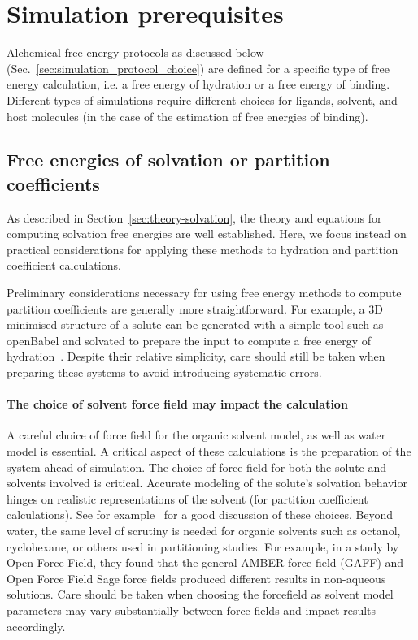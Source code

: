 \documentclass[9pt,bestpractices]{livecoms}
\begin{document}
\section{Simulation prerequisites}
\label{sec:prerequisites}
Alchemical free energy protocols as discussed below (Sec.~\ref{sec:simulation_protocol_choice}) are defined for a specific type of free energy calculation, i.e. a free energy of hydration or a free energy of binding. Different types of simulations require different choices for ligands, solvent, and host molecules (in the case of the estimation of free energies of binding). 

\subsection{Free energies of solvation or partition coefficients}
As described in Section~\ref{sec:theory-solvation}, the theory and equations for computing solvation free energies are well established. Here, we focus instead on practical considerations for applying these methods to hydration and partition coefficient calculations.

\label{subsec:hydration}
Preliminary considerations necessary for using free energy methods to compute partition coefficients are generally more straightforward. For example, a 3D minimised structure of a solute can be generated with a simple tool such as openBabel and solvated to prepare the input to compute a free energy of hydration~\cite{oboyle2011open}. Despite their relative simplicity, care should still be taken when preparing these systems to avoid introducing systematic errors.

\paragraph{The choice of solvent force field may impact the calculation}
A careful choice of force field for the organic solvent model, as well as water model is essential. A critical aspect of these calculations is the preparation of the system ahead of simulation. The choice of force field for both the solute and solvents involved is critical. Accurate modeling of the solute's solvation behavior hinges on realistic representations of the solvent (for partition coefficient calculations). See for example~\cite{bosisio2016blinded,rustenburg2016measuring} for a good discussion of these choices.  Beyond water, the same level of scrutiny is needed for organic solvents such as octanol, cyclohexane, or others used in partitioning studies. For example, in a study by Open Force Field, they found that the general AMBER force field (GAFF)\cite{wang2004gaff} and Open Force Field Sage \cite{boothroyd2023sage} force fields produced different results in non-aqueous solutions. Care should be taken when choosing the forcefield as solvent model parameters may vary substantially between force fields \cite{jambeck2003, kadaoluwa_2021, mobley_2007charge} and impact results accordingly.
\end{document}
